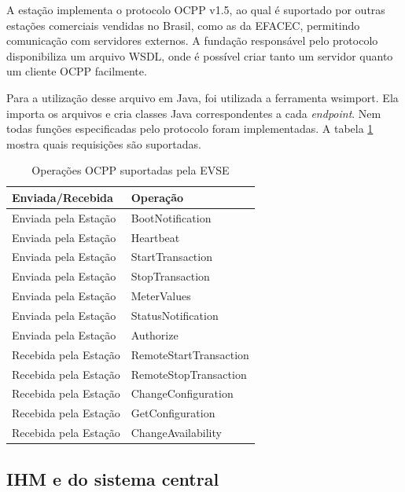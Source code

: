 A estação implementa o protocolo \ac{OCPP} v1.5, ao qual é suportado por outras estações comerciais vendidas no Brasil, como as da EFACEC, permitindo comunicação com servidores externos. A fundação responsável pelo protocolo disponibiliza um arquivo WSDL, onde é possível criar tanto um servidor quanto um cliente OCPP facilmente.

Para a utilização desse arquivo em Java, foi utilizada a ferramenta wsimport. Ela importa os arquivos e cria classes Java correspondentes a cada \textit{endpoint}. Nem todas funções especificadas pelo protocolo foram implementadas. A tabela \ref{table:ocpp} mostra quais requisições são suportadas.

\begin{table}[]
  \centering
  \caption{Operações OCPP suportadas pela EVSE}
  \label{table:ocpp}
  \begin{tabular}{@{}ll@{}}
    \toprule
    \textbf{Enviada/Recebida} & \textbf{Operação}      \\ \midrule
      Enviada pela Estação      & BootNotification       \\
      Enviada pela Estação      & Heartbeat              \\
      Enviada pela Estação      & StartTransaction       \\
      Enviada pela Estação      & StopTransaction        \\
      Enviada pela Estação      & MeterValues            \\
      Enviada pela Estação      & StatusNotification     \\
      Enviada pela Estação      & Authorize              \\
      Recebida pela Estação     & RemoteStartTransaction \\
      Recebida pela Estação     & RemoteStopTransaction  \\
      Recebida pela Estação     & ChangeConfiguration    \\
      Recebida pela Estação     & GetConfiguration       \\
      Recebida pela Estação     & ChangeAvailability     \\ \bottomrule
    \end{tabular}
\end{table}

\subsection{IHM e do sistema central}

